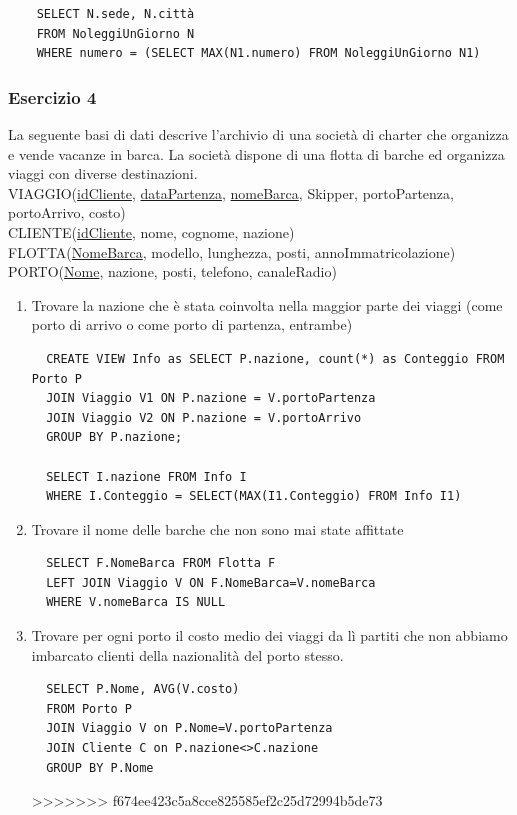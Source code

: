 \documentclass[a4paper]{article}
\begin{document}
\begin{enumerate}[leftmargin=*]
\begin{enumerate}
\begin{verbatim}
    SELECT N.sede, N.città
    FROM NoleggiUnGiorno N
    WHERE numero = (SELECT MAX(N1.numero) FROM NoleggiUnGiorno N1)
  \end{verbatim}
\end{enumerate}

\subsubsection{Esercizio 4}
La seguente basi di dati descrive l'archivio di una società di charter che organizza e vende vacanze in barca. La società dispone di una flotta di barche ed organizza viaggi con diverse destinazioni.\medskip\\
VIAGGIO(\underline{idCliente}, \underline{dataPartenza}, \underline{nomeBarca}, Skipper, portoPartenza, portoArrivo, costo)\\
CLIENTE(\underline{idCliente}, nome, cognome, nazione)\\
FLOTTA(\underline{NomeBarca}, modello, lunghezza, posti, annoImmatricolazione)\\
PORTO(\underline{Nome}, nazione, posti, telefono, canaleRadio)
\begin{enumerate}
\item Trovare la nazione che è stata coinvolta nella maggior parte dei viaggi (come porto di arrivo o come porto di partenza, entrambe)
  \begin{verbatim}
  CREATE VIEW Info as SELECT P.nazione, count(*) as Conteggio FROM Porto P
  JOIN Viaggio V1 ON P.nazione = V.portoPartenza
  JOIN Viaggio V2 ON P.nazione = V.portoArrivo
  GROUP BY P.nazione;

  SELECT I.nazione FROM Info I
  WHERE I.Conteggio = SELECT(MAX(I1.Conteggio) FROM Info I1)
  \end{verbatim}
\item Trovare il nome delle barche che non sono mai state affittate
  \begin{verbatim}
  SELECT F.NomeBarca FROM Flotta F
  LEFT JOIN Viaggio V ON F.NomeBarca=V.nomeBarca
  WHERE V.nomeBarca IS NULL
  \end{verbatim}
\item Trovare per ogni porto il costo medio dei viaggi da lì partiti che non abbiamo imbarcato clienti della nazionalità del porto stesso.
  \begin{verbatim}
  SELECT P.Nome, AVG(V.costo)
  FROM Porto P
  JOIN Viaggio V on P.Nome=V.portoPartenza
  JOIN Cliente C on P.nazione<>C.nazione
  GROUP BY P.Nome
  \end{verbatim}
>>>>>>> f674ee423c5a8cce825585ef2c25d72994b5de73
\end{enumerate}


\end{enumerate}
\end{document}
